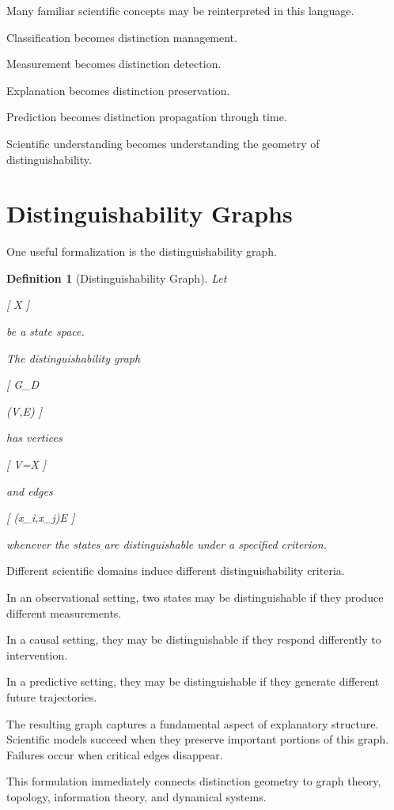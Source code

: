 \documentclass[11pt,oneside,openany]{book}
\newtheorem{definition}{Definition}[chapter] \newtheorem{theorem}{Theorem}[chapter] \newtheorem{proposition}{Proposition}[chapter] \newtheorem{lemma}{Lemma}[chapter] \newtheorem{corollary}{Corollary}[chapter] \newtheorem{remark}{Remark}[chapter]
\begin{document}
Many familiar scientific concepts may be reinterpreted in this language.

Classification becomes distinction management.

Measurement becomes distinction detection.

Explanation becomes distinction preservation.

Prediction becomes distinction propagation through time.

Scientific understanding becomes understanding the geometry of distinguishability.

\section{Distinguishability Graphs}

One useful formalization is the distinguishability graph.

\begin{definition}[Distinguishability Graph]

Let

[
\mathcal X
]

be a state space.

The distinguishability graph

[
G_D

(V,E)
]

has vertices

[
V=\mathcal X
]

and edges

[
(x_i,x_j)\in E
]

whenever the states are distinguishable under a specified criterion.

\end{definition}

Different scientific domains induce different distinguishability criteria.

In an observational setting, two states may be distinguishable if they produce different measurements.

In a causal setting, they may be distinguishable if they respond differently to intervention.

In a predictive setting, they may be distinguishable if they generate different future trajectories.

The resulting graph captures a fundamental aspect of explanatory structure. Scientific models succeed when they preserve important portions of this graph. Failures occur when critical edges disappear.

This formulation immediately connects distinction geometry to graph theory, topology, information theory, and dynamical systems.
\end{document}
